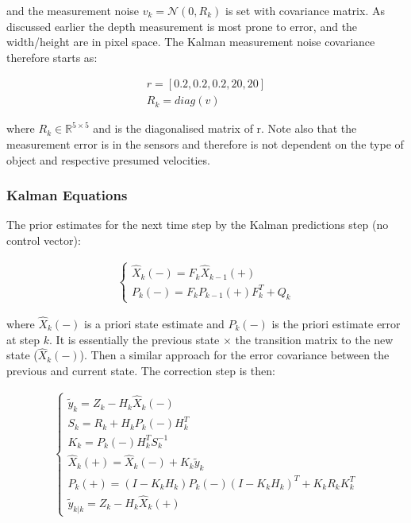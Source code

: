\documentclass[11pt,twoside]{report}
\begin{document}
and the measurement noise $v_{k} = \mathcal{N}(0,R_{k})$ is set with covariance matrix. As discussed earlier the depth measurement is most prone to error, and the width/height are in pixel space. The Kalman measurement noise covariance therefore starts as:

\begin{equation}
\begin{aligned}
r = [0.2,0.2,0.2,20,20] \\
R_{k} = diag(v)
\end{aligned}
\end{equation}

where $R_{k} \in \mathbb{R}^{5 \times 5}$ and is the diagonalised matrix of r. Note also that the measurement error is in the sensors and therefore is not dependent on the type of object and respective presumed velocities.

\subsubsection{Kalman Equations}
The prior estimates for the next time step by the Kalman predictions step (no control vector):

\begin{equation}
\label{Kalman_pred_eq}
\begin{aligned}
\begin{cases}
\hat{X}_{k}(-) =  F_{k} \hat{X}_{k-1}(+)\\
P_{k}(-) = F_{k} P_{k-1}(+) F_{k}^{T} + Q_{k}
\end{cases}
\end{aligned}
\end{equation}

where $\hat{X}_{k}(-)$ is a priori state estimate and $P_{k}(-)$ is the priori estimate error at step $k$. It is essentially the previous state $\times$ the transition matrix to the new state ($\hat{X}_{k}(-)$). Then a similar approach for the error covariance between the previous and current state. The correction step is then:

\begin{equation}
\begin{aligned}
\begin{cases}
\label{kalman_update_equs}
\tilde{y}_{k} = Z_{k} - H_{k} \hat{X}_{k}(-) \\
S_{k} = R_{k} + H_{k}P_{k}(-)H_{k}^{T} \\
K_{k} = P_{k}(-) H_{k}^{T} S_{k}^{-1} \\ 
\hat{X}_{k}(+) = \hat{X}_{k}(-) + K_{k} \tilde{y}_{k}\\
P_{k}(+) = (I-K_{k}H_{k}) P_{k}(-)(I-K_{k}H_{k})^{T} + K_{k}R_{k}K_{k}^{T} \\
\tilde{y}_{k|k} = Z_{k} - H_{k} \hat{X}_{k}(+)

\end{cases}
\end{aligned}
\end{equation}
\end{document}
